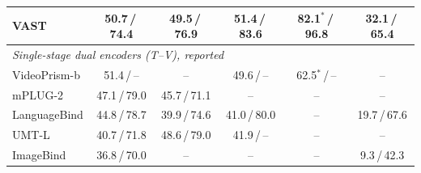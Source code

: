 \begin{table}[t]
\begin{tabular}{lccccc}
VAST & 50.7\,/\,74.4 & 49.5\,/\,76.9 & 51.4\,/\,83.6 & 82.1$^{*}$\,/\,96.8 & 32.1\,/\,65.4 \\
\midrule
\multicolumn{6}{l}{\emph{Single-stage dual encoders (T--V), reported}} \\
VideoPrism-b & 51.4\,/\,-- & -- & 49.6\,/\,-- & 62.5$^{*}$\,/\,-- & -- \\
mPLUG-2 & 47.1\,/\,79.0 & 45.7\,/\,71.1 & -- & -- & -- \\
LanguageBind & 44.8\,/\,78.7 & 39.9\,/\,74.6 & 41.0\,/\,80.0 & -- & 19.7\,/\,67.6 \\
UMT-L & 40.7\,/\,71.8 & 48.6\,/\,79.0 & 41.9\,/\,-- & -- & -- \\
ImageBind & 36.8\,/\,70.0 & -- & -- & -- & 9.3\,/\,42.3 \\
\bottomrule
\end{tabular}
\end{table}
